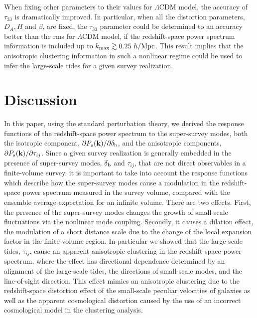 \documentclass[prd,onecolumn,notitlepage,amsmath,amssymb,floatfix,superscriptaddress]{revtex4-1}
\newcommand{\bk}{{\bf k}}
\begin{document}
When fixing other parameters to their values for $\Lambda$CDM model, the accuracy of $\tau_{33}$ is dramatically improved. In particular, 
when all the distortion parameters, $D_A, H$ and $\beta$, are fixed, the $\tau_{33}$ parameter could be determined to an accuracy better than 
the rms for $\Lambda$CDM model, if the redshift-space power spectrum information is included up to $k_{\rm max}\gtrsim 0.25~h/{\rm Mpc}$.
This result implies that the anisotropic clustering information 
in such a nonlinear regime could be used to infer the large-scale tides for a given survey realization. 

\section{Discussion}
\label{sec:discussion}

In this paper, using the standard perturbation theory, we derived
the response functions of the redshift-space power spectrum to the super-survey modes,
both the isotropic component, $\partial P_s(\bk)/\partial \delta_{\rm b}$, and the anisotropic components, $\partial P_s(\bk)/\partial \tau_{ij}$.
Since a given survey realization is generally embedded in the presence of super-survey modes, $\delta_{\rm b}$ and $\tau_{ij}$, that are not direct observables in a finite-volume survey, it is important to take into account 
the response functions which describe how the super-survey modes cause a modulation in the redshift-space power spectrum measured in the survey volume, compared with the ensemble average expectation for an infinite volume. There are two effects. First, the presence of 
the super-survey modes changes the growth of small-scale fluctuations via the nonlinear mode coupling. Secondly, it
causes a dilation effect, the modulation of a short distance scale due to the change of the local expansion factor in the finite volume region. 
In particular we showed that the large-scale tides, $\tau_{ij}$, cause an apparent anisotropic clustering in the redshift-space power spectrum, where the effect has directional dependence determined by an alignment of the large-scale tides, the directions of 
 small-scale  modes, and the line-of-sight direction. 
This effect mimics an anisotropic clustering due to the 
redshift-space distortion effect of the small-scale peculiar velocities of galaxies as well as 
the apparent cosmological distortion caused by the use of an incorrect cosmological model in the clustering analysis. 
\end{document}
